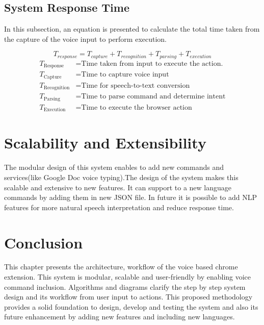 \subsection{System Response Time}
In this subsection, an equation is presented to calculate the total time taken from the capture of the voice input to perform execution.
\vspace{.5in}

\begin{equation}
T_{response} = T_{capture} + T_{recognition} + T_{parsing} + T_{execution}
\end{equation}
\begin{align*}
T_{\text{Response}} &= \text{Time taken from input to execute the action.} \\
T_{\text{Capture}} &= \text{Time to capture voice input} \\
T_{\text{Recognition}} &= \text{Time for speech-to-text conversion} \\
T_{\text{Parsing}} &= \text{Time to parse command and determine intent} \\
T_{\text{Execution}} &= \text{Time to execute the browser action}
\end{align*}

\section{Scalability and Extensibility}
The modular design of this system enables to add new commands and services(like Google Doc voice typing).The design of the system makes this scalable and extensive to new features. It can support to a new language commands by adding them in new JSON file. In future it is possible to add NLP features for more natural speech interpretation and reduce response time. 
\section{Conclusion}
This chapter presents the architecture, workflow of the voice based chrome extension. This system is modular, scalable and user-friendly by enabling voice command inclusion. Algorithms and diagrams clarify the step by step system design and its workflow from user input to actions. 
This proposed methodology provides a solid foundation to design, develop and testing the system and also its future enhancement by adding new features and including new languages.






